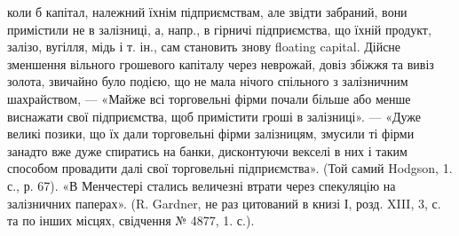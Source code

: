 \parcont{}  %
коли б капітал, належний їхнім підприємствам, але звідти забраний, вони примістили
не в залізниці, а, напр., в гірничі підприємства, що їхній продукт,
залізо, вугілля, мідь і т. ін., сам становить знову floating capital. Дійсне зменшення
вільного грошевого капіталу через неврожай, довіз збіжжя та вивіз
золота, звичайно було подією, що не мала нічого спільного з залізничним
шахрайством, — «Майже всі торговельні фірми почали більше або менше виснажати
свої підприємства, щоб примістити гроші в залізниці». — «Дуже великі позики,
що їх дали торговельні фірми залізницям, змусили ті фірми занадто вже дуже
спиратись на банки, дисконтуючи векселі в них і таким способом провадити
далі свої торговельні підприємства». (Той самий Hodgson, 1. с., р. 67). «В Менчестері
стались величезні втрати через спекуляцію на залізничних паперах».
(R. Gardner, не раз цитований в книзі І, розд. XIII, 3, с. та по інших місцях,
свідчення № 4877, 1. с.).

